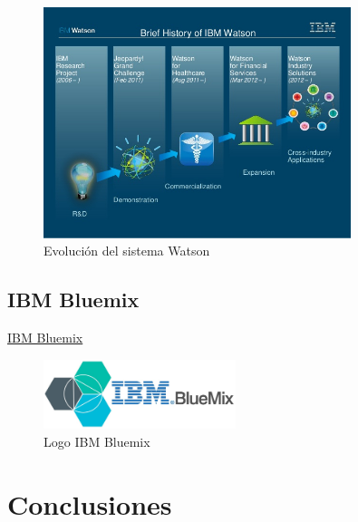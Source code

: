 \documentclass[paper=a4, fontsize=10pt]{scrartcl} %
\numberwithin{equation}{section} %
\numberwithin{figure}{section} %
\numberwithin{table}{section} %
\begin{document}
\begin{figure}[H]
	\centering
	\label{watson2today}
	\includegraphics[trim = 0mm 14mm 0mm 10mm, clip, width=0.8\textwidth]{./Imagenes/watson2today.jpg}
	\caption{Evolución del sistema Watson \cite{watson-history}}
\end{figure}



\subsection{IBM Bluemix}
\href{https://www.ibm.com/cloud-computing/bluemix/es/node/2041}{IBM Bluemix}

\begin{figure}[H]
	\centering
	\label{ibm-bluemix.jpg}
	\includegraphics[width=0.5\textwidth]{./Imagenes/ibm-bluemix.jpg}
	\caption{Logo IBM Bluemix \cite{bluemix-image}}
\end{figure}





\section{Conclusiones}




\newpage
\end{document}
